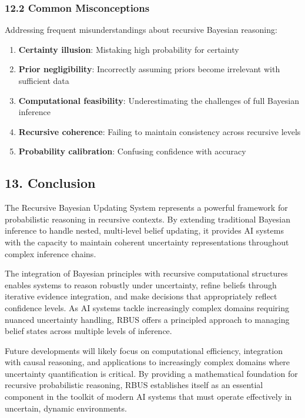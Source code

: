 \documentclass[
]{article}
\providecommand{\tightlist}{%
  \setlength{\itemsep}{0pt}\setlength{\parskip}{0pt}}
\begin{document}
\subsubsection{12.2 Common Misconceptions}\label{common-misconceptions}

Addressing frequent misunderstandings about recursive Bayesian
reasoning:

\begin{enumerate}
\def\labelenumi{\arabic{enumi}.}
\tightlist
\item
  \textbf{Certainty illusion}: Mistaking high probability for certainty
\item
  \textbf{Prior negligibility}: Incorrectly assuming priors become
  irrelevant with sufficient data
\item
  \textbf{Computational feasibility}: Underestimating the challenges of
  full Bayesian inference
\item
  \textbf{Recursive coherence}: Failing to maintain consistency across
  recursive levels
\item
  \textbf{Probability calibration}: Confusing confidence with accuracy
\end{enumerate}

\subsection{13. Conclusion}\label{conclusion-1}

The Recursive Bayesian Updating System represents a powerful framework
for probabilistic reasoning in recursive contexts. By extending
traditional Bayesian inference to handle nested, multi-level belief
updating, it provides AI systems with the capacity to maintain coherent
uncertainty representations throughout complex inference chains.

The integration of Bayesian principles with recursive computational
structures enables systems to reason robustly under uncertainty, refine
beliefs through iterative evidence integration, and make decisions that
appropriately reflect confidence levels. As AI systems tackle
increasingly complex domains requiring nuanced uncertainty handling,
RBUS offers a principled approach to managing belief states across
multiple levels of inference.

Future developments will likely focus on computational efficiency,
integration with causal reasoning, and applications to increasingly
complex domains where uncertainty quantification is critical. By
providing a mathematical foundation for recursive probabilistic
reasoning, RBUS establishes itself as an essential component in the
toolkit of modern AI systems that must operate effectively in uncertain,
dynamic environments.
\end{document}
